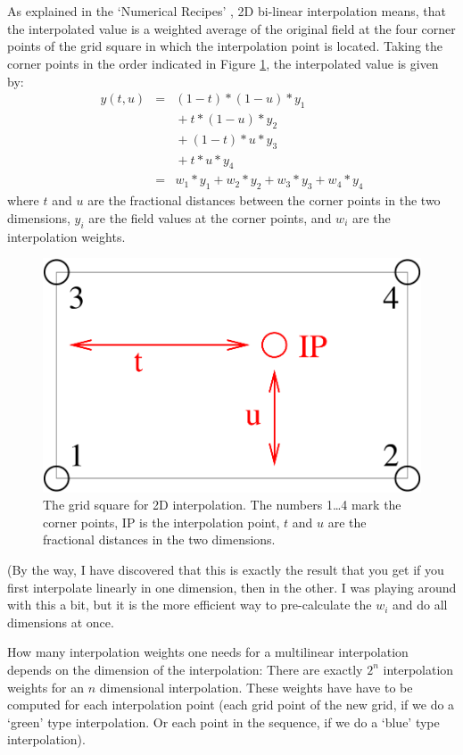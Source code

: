 \section{}

As explained in the `Numerical Recipes'
\citep{numerical_recipes_C:97}, 2D bi-linear interpolation means, that
the interpolated value is a weighted average of the original field at
the four corner points of the grid square in which the interpolation
point is located. Taking the corner points in the order indicated in Figure
\ref{fig:interpolation:square}, the interpolated value is given by:
\begin{eqnarray}
  y(t,u)
  &=& (1-t)*(1-u)*y_1 \nonumber \\
  & & \mbox{} + t*(1-u)*y_2 \nonumber \\
  & & \mbox{} + (1-t)*u*y_3 \nonumber \\
  & & \mbox{} + t*u*y_4 \nonumber \\
  &=& w_1*y_1 + w_2*y_2 + w_3*y_3 + w_4*y_4
\label{eq:interpolation:weights}
\end{eqnarray}
where $t$ and $u$ are the fractional distances between the
corner points in the two dimensions, $y_i$ are the field values
at the corner points, and $w_i$ are the interpolation weights.

\begin{figure}
  \centering
  \includegraphics[width=.4\hsize]{interpolation_square}
  \caption{The grid square for 2D interpolation. The numbers 1\ldots 4
    mark the corner points, IP is the interpolation point, $t$ and $u$
    are the fractional distances in the two dimensions.}
  \label{fig:interpolation:square}
\end{figure}

(By the way, I have discovered that this is exactly the result that
you get if you first interpolate linearly in one dimension, then in
the other. I was playing around with this a bit, but it is the more
efficient way to pre-calculate the $w_i$ and do all dimensions at once.

How many interpolation weights one needs for a multilinear
interpolation depends on the dimension of the interpolation: There are
exactly $2^n$ interpolation weights for an $n$ dimensional
interpolation.  These weights have have to be computed for each
interpolation point (each grid point of the new grid, if we do a
`green' type interpolation. Or each point in the sequence, if we do a
`blue' type interpolation).


